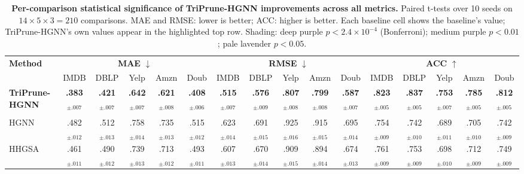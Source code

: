 \documentclass[10pt]{article}
\theoremstyle{plain}
\newcommand{\cg}[1]{\cellcolor{tierBonf}#1}
\theoremstyle{definition}
\begin{document}
\begin{table}
\centering
\caption{\textbf{Per-comparison statistical significance of TriPrune-HGNN improvements across all metrics.}
Paired t-tests over 10 seeds on $14\!\times\!5\!\times\!3=210$ comparisons.
MAE and RMSE: lower is better; ACC: higher is better. Each baseline cell shows the baseline's value;
TriPrune-HGNN's own values appear in the highlighted top row.
Shading: \colorbox{tierBonf}{deep purple} $p<2.4\!\times\!10^{-4}$ (Bonferroni);
\colorbox{tier01}{medium purple} $p<0.01$;
\colorbox{tier05}{pale lavender} $p<0.05$.}
\label{tab:sig_combined}
\scriptsize
\setlength{\tabcolsep}{3pt}
\renewcommand{\arraystretch}{1.25}
\begin{tabular}{l ccccc ccccc ccccc}
\toprule
\multirow{2}{*}{\textbf{Method}}
& \multicolumn{5}{c}{\textbf{MAE} $\downarrow$}
& \multicolumn{5}{c}{\textbf{RMSE} $\downarrow$}
& \multicolumn{5}{c}{\textbf{ACC} $\uparrow$} \\
\cmidrule(lr){2-6} \cmidrule(lr){7-11} \cmidrule(lr){12-16}
 & IMDB & DBLP & Yelp & Amzn & Doub
 & IMDB & DBLP & Yelp & Amzn & Doub
 & IMDB & DBLP & Yelp & Amzn & Doub \\
\midrule
\rowcolor{rowHead}
\textbf{TriPrune-HGNN}
 & \textbf{.383}$_{\pm.007}$ & \textbf{.421}$_{\pm.007}$ & \textbf{.642}$_{\pm.007}$ & \textbf{.621}$_{\pm.008}$ & \textbf{.408}$_{\pm.006}$
 & \textbf{.515}$_{\pm.007}$ & \textbf{.576}$_{\pm.009}$ & \textbf{.807}$_{\pm.008}$ & \textbf{.799}$_{\pm.008}$ & \textbf{.587}$_{\pm.007}$
 & \textbf{.823}$_{\pm.005}$ & \textbf{.837}$_{\pm.005}$ & \textbf{.753}$_{\pm.007}$ & \textbf{.785}$_{\pm.005}$ & \textbf{.812}$_{\pm.005}$ \\
\midrule
\rowcolor{groupBar}\multicolumn{16}{l}{\textit{Standard HGNN methods}} \\
HGNN
 & \cg{.482$_{\pm.012}$} & \cg{.512$_{\pm.013}$} & \cg{.758$_{\pm.014}$} & \cg{.735$_{\pm.013}$} & \cg{.515$_{\pm.012}$}
 & \cg{.623$_{\pm.014}$} & \cg{.691$_{\pm.015}$} & \cg{.925$_{\pm.016}$} & \cg{.915$_{\pm.015}$} & \cg{.695$_{\pm.014}$}
 & \cg{.754$_{\pm.009}$} & \cg{.742$_{\pm.010}$} & \cg{.689$_{\pm.011}$} & \cg{.705$_{\pm.010}$} & \cg{.742$_{\pm.009}$} \\
HHGSA
 & \cg{.461$_{\pm.011}$} & \cg{.490$_{\pm.012}$} & \cg{.739$_{\pm.013}$} & \cg{.713$_{\pm.012}$} & \cg{.493$_{\pm.011}$}
 & \cg{.607$_{\pm.013}$} & \cg{.670$_{\pm.014}$} & \cg{.909$_{\pm.015}$} & \cg{.894$_{\pm.014}$} & \cg{.674$_{\pm.013}$}
 & \cg{.761$_{\pm.009}$} & \cg{.753$_{\pm.009}$} & \cg{.698$_{\pm.010}$} & \cg{.712$_{\pm.009}$} & \cg{.749$_{\pm.009}$} \\

\end{tabular}
\end{table}
\end{document}
